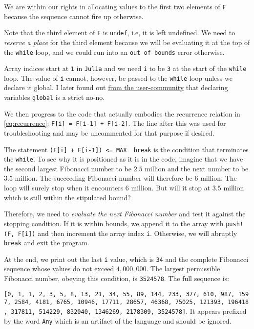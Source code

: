 \documentclass[
  a4paper,
]{article}
\begin{document}
We are within our rights in allocating values to the first two elements
of \texttt{F} because the sequence cannot fire up otherwise.

Note that the third element of \texttt{F} is \texttt{undef}, i.e, it is
left undefined. We need to \emph{reserve a place} for the third element
because we will be evaluating it at the top of the \texttt{while} loop,
and we could run into an \texttt{out\ of\ bounds} error otherwise.

Array indices start at \texttt{1} in \texttt{Julia} and we need
\texttt{i} to be \texttt{3} at the start of the \texttt{while} loop. The
value of \texttt{i} cannot, however, be passed to the \texttt{while}
loop unless we declare it global. I later found out
\href{https://discourse.julialang.org/t/help-with-project-euler-2-undef-inits-printing-multiplication-by-juxtaposition-and-more/106930}{from
the user-community} that declaring variables \texttt{global} is a strict
no-no.

We then progress to the code that actually embodies the recurrence
relation in \cref{eq:recurrence}:
\texttt{F{[}i{]}\ =\ F{[}i-1{]}\ +\ F{[}i-2{]}}. The line after this was
used for troubleshooting and may be uncommented for that purpose if
desired.

The statement
\texttt{(F{[}i{]}\ +\ F{[}i-1{]})\ \textless{}=\ MAX\ \textbar{}\textbar{}\ break}
is the condition that terminates the \texttt{while}. To see why it is
positioned as it is in the code, imagine that we have the second largest
Fibonacci number to be \(2.5\) million and the next number to be \(3.5\)
million. The succeeding Fibonacci number will therefore be \(6\)
million. The loop will surely stop when it encounters \(6\) million. But
will it stop at \(3.5\) million which is still within the stipulated
bound?

Therefore, we need to \emph{evaluate the next Fibonacci number} and test
it against the stopping condition. If it is within bounds, we append it
to the array with \texttt{push!(F,\ F{[}i{]})} and then increment the
array index \texttt{i}. Otherwise, we will abruptly \texttt{break} and
exit the program.

At the end, we print out the last \texttt{i} value, which is \texttt{34}
and the complete Fibonacci sequence whose values do not exceed
\(4,000,000\). The largest permissible Fibonacci number, obeying this
condition, is \texttt{3524578}. The full sequence is:

\texttt{{[}0,\ 1,\ 1,\ 2,\ 3,\ 5,\ 8,\ 13,\ 21,\ 34,\ 55,\ 89,\ 144,\ 233,\ 377,\ 610,\ 987,\ 1597,\ 2584,\ 4181,\ 6765,\ 10946,\ 17711,\ 28657,\ 46368,\ 75025,\ 121393,\ 196418,\ 317811,\ 514229,\ 832040,\ 1346269,\ 2178309,\ 3524578{]}}.
It appears prefixed by the word \texttt{Any} which is an artifact of the
language and should be ignored.
\end{document}
